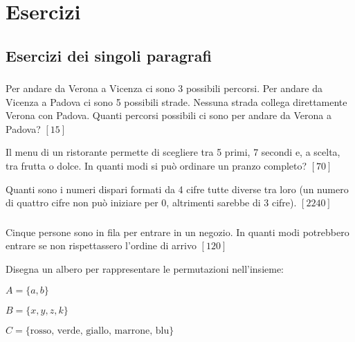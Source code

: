 
\section{Esercizi}

\subsection{Esercizi dei singoli paragrafi}

\subsubsection*{}

\begin{esercizio}
\label{ese:I.1}
Per andare da Verona a Vicenza ci sono 3 possibili percorsi. Per andare da Vicenza a Padova ci sono 5 possibili strade. Nessuna strada collega direttamente Verona con Padova. Quanti percorsi possibili ci sono per andare da Verona a Padova?
\hfill $\left[15\right]$
\end{esercizio}

\begin{esercizio}
\label{ese:I.2}
Il menu di un ristorante permette di scegliere tra 5 primi, 7 secondi e, a scelta, tra frutta o dolce. In quanti modi si può ordinare un pranzo completo?
\hfill $\left[70\right]$
\end{esercizio}

\begin{esercizio}\label{ese:I.3}
Quanti sono i numeri dispari formati da 4 cifre tutte diverse tra loro (un numero di quattro cifre non può iniziare per 0, altrimenti sarebbe di 3 cifre).
\hfill $\left[2240\right]$
\end{esercizio}


\subsubsection*{}
\begin{esercizio}
\label{ese:P.1}
Cinque persone sono in fila per entrare in un negozio. In quanti modi potrebbero entrare se non rispettassero l'ordine di arrivo
\hfill $\left[120\right]$
\end{esercizio}

\begin{esercizio}\label{ese:P.2}
Disegna un albero per rappresentare le permutazioni nell'insieme:
 \begin{enumeratea}
  \item $A=\{ a,b\}$
  \item $B=\{ x,y,z,k\}$
  \item $C=\{\text{rosso, verde, giallo, marrone, blu}\}$
 \end{enumeratea}
\end{esercizio}

